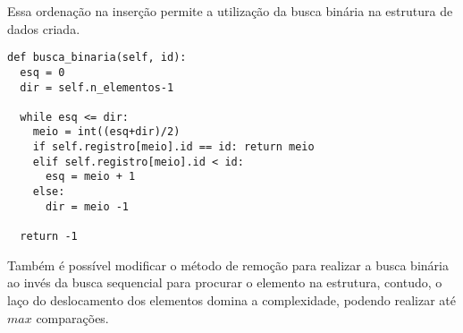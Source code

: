 \documentclass[a4paper, twocolumn]{article}
\theoremstyle{definition}
\begin{document}
Essa ordenação na inserção permite a utilização da busca binária na estrutura de dados criada.

\begin{lstlisting}[label=lista_linear_busca_bin,caption= Lista linear sequencial ordenada (busca binária)]
def busca_binaria(self, id):
  esq = 0
  dir = self.n_elementos-1
     
  while esq <= dir:
    meio = int((esq+dir)/2)
    if self.registro[meio].id == id: return meio 
    elif self.registro[meio].id < id: 
      esq = meio + 1
    else:
      dir = meio -1
  
  return -1 
\end{lstlisting}

Também é possível modificar o método de remoção para realizar a busca binária ao invés da busca sequencial para procurar o elemento na estrutura, contudo, o laço do deslocamento dos elementos domina a complexidade, podendo realizar até $max$ comparações.
\end{document}
